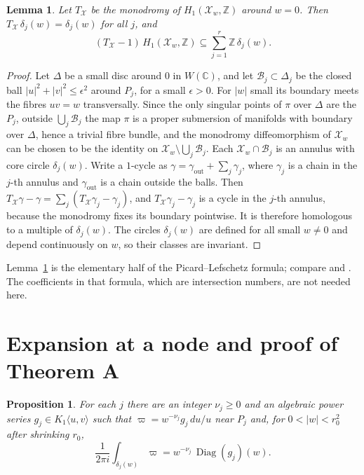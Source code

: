 \documentclass[11pt]{amsart}
\newtheorem{proposition}[theorem]{Proposition}
\newtheorem{lemma}[theorem]{Lemma}
\theoremstyle{definition}
\theoremstyle{remark}
\numberwithin{equation}{section}
\newcommand{\Z}{\mathbb{Z}}
\newcommand{\C}{\mathbb{C}}
\newcommand{\cX}{\mathcal{X}}
\newcommand{\cB}{\mathcal{B}}
\newcommand{\alg}[2]{#1\langle #2\rangle}
\DeclareMathOperator{\Diag}{Diag}
\begin{document}
\begin{lemma}\label{lem:variation}
Let $T_{\cX}$ be the monodromy of $H_1(\cX_w,\Z)$ around $w=0$. Then $T_{\cX}\,\delta_j(w)=\delta_j(w)$ for all $j$, and
\[
(T_{\cX}-1)\,H_1(\cX_w,\Z)\subseteq\sum_{j=1}^r\Z\,\delta_j(w).
\]
\end{lemma}

\begin{proof}
Let $\Delta$ be a small disc around $0$ in $W(\C)$, and let $\cB_j\subset\Delta_j$ be the closed ball $|u|^2+|v|^2\le\epsilon^2$ around $P_j$, for a small $\epsilon>0$. For $|w|$ small its boundary meets the fibres $uv=w$ transversally. Since the only singular points of $\pi$ over $\Delta$ are the $P_j$, outside $\bigcup_j\cB_j$ the map $\pi$ is a proper submersion of manifolds with boundary over $\Delta$, hence a trivial fibre bundle, and the monodromy diffeomorphism of $\cX_w$ can be chosen to be the identity on $\cX_w\setminus\bigcup_j\cB_j$. Each $\cX_w\cap\cB_j$ is an annulus with core circle $\delta_j(w)$. Write a $1$-cycle as $\gamma=\gamma_{\mathrm{out}}+\sum_j\gamma_j$, where $\gamma_j$ is a chain in the $j$-th annulus and $\gamma_{\mathrm{out}}$ is a chain outside the balls. Then $T_{\cX}\gamma-\gamma=\sum_j(T_{\cX}\gamma_j-\gamma_j)$, and $T_{\cX}\gamma_j-\gamma_j$ is a cycle in the $j$-th annulus, because the monodromy fixes its boundary pointwise. It is therefore homologous to a multiple of $\delta_j(w)$. The circles $\delta_j(w)$ are defined for all small $w\ne0$ and depend continuously on $w$, so their classes are invariant.
\end{proof}

Lemma~\ref{lem:variation} is the elementary half of the Picard--Lefschetz formula; compare \citet[Exp.~XV]{DeligneKatz1973} and \citet{Clemens1977}. The coefficients in that formula, which are intersection numbers, are not needed here.

\section{Expansion at a node and proof of Theorem A}\label{sec:node}

\begin{proposition}\label{prop:node}
For each $j$ there are an integer $\nu_j\ge0$ and an algebraic power series $g_j\in\alg{K_1}{u,v}$ such that $\varpi=w^{-\nu_j}g_j\,du/u$ near $P_j$ and, for $0<|w|<r_0^2$ after shrinking $r_0$,
\[
\frac1{2\pi i}\int_{\delta_j(w)}\varpi=w^{-\nu_j}\,\Diag(g_j)(w).
\]
\end{proposition}
\end{document}
